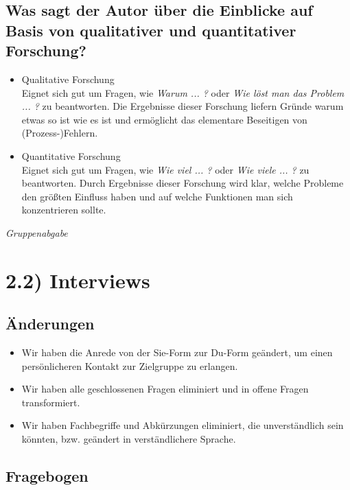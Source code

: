\documentclass{article}
\begin{document}
\subsection*{Was sagt der Autor über die Einblicke auf Basis von qualitativer und quantitativer Forschung?}

\begin{itemize}
\item Qualitative Forschung\\
Eignet sich gut um Fragen, wie \textit{Warum ... ?} oder \textit{Wie löst man das Problem ... ?} zu beantworten. Die Ergebnisse dieser Forschung liefern Gründe warum etwas so ist wie es ist und ermöglicht das elementare Beseitigen von (Prozess-)Fehlern.
\item Quantitative Forschung\\
Eignet sich gut um Fragen, wie \textit{Wie viel ... ?} oder \textit{Wie viele ... ?} zu beantworten. Durch Ergebnisse dieser Forschung wird klar, welche Probleme den größten Einfluss haben und auf welche Funktionen man sich konzentrieren sollte.
\end{itemize}

\newpage

\textit{Gruppenabgabe}

\section*{2.2) Interviews}

\subsection*{Änderungen}

\begin{itemize}
\item Wir haben die Anrede von der Sie-Form zur Du-Form geändert, um einen persönlicheren Kontakt zur Zielgruppe zu erlangen.
\item Wir haben alle geschlossenen Fragen eliminiert und in offene Fragen transformiert.
\item Wir haben Fachbegriffe und Abkürzungen eliminiert, die unverständlich sein könnten, bzw. geändert in verständlichere Sprache.
\end{itemize}


\subsection*{Fragebogen}
\end{document}
